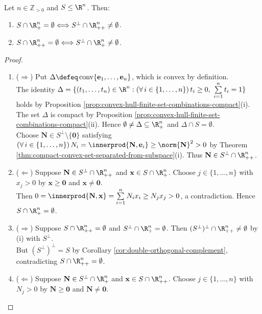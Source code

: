 \begin{theorem} \label{thm:positive-subspace-alternatives} \\
Let $n\in\mathbb{Z}_{>0}$ and $S\leq\R^n$. Then:
\begin{enumerate}[label=(\roman*)]
\setlength{\itemsep}{0pt}
\item $S\cap\R_+^n=\emptyset \Longleftrightarrow S^\perp\cap\R_{++}^n\neq\emptyset$.
\item $S\cap\R_{++}^n=\emptyset \Longleftrightarrow S^\perp\cap\R_+^n\neq\emptyset$.
\end{enumerate}
\begin{proof}
\begin{enumerate}[label=(\roman*)]
\setlength{\itemsep}{0pt}
\item[$(i)$] ($\Rightarrow$) Put $\Delta\defeq\operatorname{conv}\{\mathbf{e}_1,\ldots,\mathbf{e}_n\}$, which is convex by definition.\\
The identity $\Delta=\{(t_1,\ldots,t_n)\in\R^n:(\forall\,i\in\{1,\ldots,n\})\,t_i\geq0,\ \sum\limits_{i=1}^{n}t_i=1\}$ holds by Proposition \ref{prop:convex-hull-finite-set-combinations-compact}(i).\\
The set $\Delta$ is compact by Proposition \ref{prop:convex-hull-finite-set-combinations-compact}(ii). Hence $\emptyset\neq\Delta\subseteq\R_+^n$ and $\Delta\cap S=\emptyset$.\\
Choose $\mathbf{N}\in S^\perp\setminus\{\mathbf{0}\}$ satisfying $(\forall\,i\in\{1,\ldots,n\})\,N_i=\innerprod{\mathbf{N},\mathbf{e}_i}\geq\norm{\mathbf{N}}^2>0$ by Theorem \ref{thm:compact-convex-set-separated-from-subspace}(i). Thus $\mathbf{N}\in S^\perp\cap\R_{++}^n$.
\item[$(i)$] ($\Leftarrow$) Suppose $\mathbf{N}\in S^\perp\cap\R_{++}^n$ and $\mathbf{x}\in S\cap\R_+^n$. Choose $j\in\{1,\ldots,n\}$ with $x_j>0$ by $\mathbf{x}\geq\mathbf{0}$ and $\mathbf{x}\neq\mathbf{0}$.\\
Then $0=\innerprod{\mathbf{N},\mathbf{x}}=\sum\limits_{i=1}^{n}N_ix_i\geq N_jx_j>0$, a contradiction. Hence $S\cap\R_+^n=\emptyset$.
\item[$(ii)$] ($\Rightarrow$) Suppose $S\cap\R_{++}^n=\emptyset$ and $S^\perp\cap\R_+^n=\emptyset$. Then $(S^\perp)^\perp\cap\R_{++}^n\neq\emptyset$ by (i) with $S^\perp$.\\
But $(S^\perp)^\perp=S$ by Corollary \ref{cor:double-orthogonal-complement}, contradicting $S\cap\R_{++}^n=\emptyset$.
\item[$(ii)$] ($\Leftarrow$) Suppose $\mathbf{N}\in S^\perp\cap\R_+^n$ and $\mathbf{x}\in S\cap\R_{++}^n$. Choose $j\in\{1,\ldots,n\}$ with $N_j>0$ by $\mathbf{N}\geq\mathbf{0}$ and $\mathbf{N}\neq\mathbf{0}$.\\

\end{enumerate}
\end{proof}
\end{theorem}
